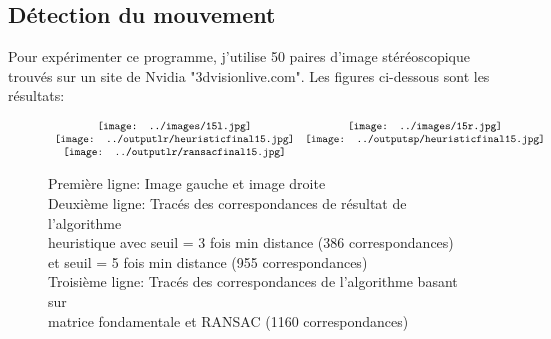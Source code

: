 \documentclass[french,12pt,a4paper,oneside,notitlepage]{report}
\begin{document}
\subsection{Détection du mouvement}
Pour expérimenter ce programme, j'utilise 50 paires d'image stéréoscopique trouvés 
sur un site de Nvidia "3dvisionlive.com". Les figures ci-dessous sont les résultats: 
 \begin{figure}[ht]
	\begin{center}$
		\begin{array}[h]{cc}
		  \texttt{[image: ../images/15l.jpg]}&
		  \texttt{[image: ../images/15r.jpg]}\\
		  \texttt{[image: ../outputlr/heuristicfinal15.jpg]}&
		  \texttt{[image: ../outputsp/heuristicfinal15.jpg]}\\
		  \texttt{[image: ../outputlr/ransacfinal15.jpg]}&
		\end{array}$
	\end{center}
	\caption{Première ligne: Image gauche et image droite \\
	\hspace*{1.7cm} Deuxième ligne: Tracés des correspondances de résultat de 
l'algorithme \\
	\hspace*{1.7cm} heuristique avec seuil = 3 fois min distance (386 correspondances)\\
	\hspace*{1.7cm} et seuil = 5 fois min distance (955 correspondances) \\
	\hspace*{1.7cm} Troisième ligne: Tracés des correspondances de l'algorithme basant 
sur \\
	\hspace*{1.7cm} matrice fondamentale et RANSAC (1160 correspondances)} 
\end{figure}
\end{document}
